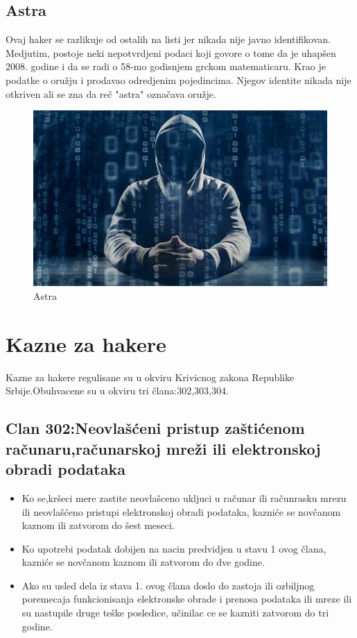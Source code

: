 \documentclass[a4paper]{article}
\begin{document}
\subsection{Astra}
Ovaj haker se razlikuje od ostalih na listi jer nikada nije javno identifikovan. Medjutim, postoje neki nepotvrdjeni podaci koji govore o tome da je uhapšen 2008. godine i da se radi o 58-mo godisnjem grckom matematicaru. Krao je podatke o oružju i prodavao odredjenim pojedincima. Njegov identite nikada nije otkriven ali se zna da reč "astra" označava oružje.
\begin{figure}[h!]
	\begin{center}
		\includegraphics[scale=0.20]{astra.jpg}
	\end{center}
	\caption{Astra}
	\label{fig:astra}
\end{figure}
\newpage
\section{Kazne za hakere}
\label{kazne}
Kazne za hakere regulisane su u okviru Krivicnog zakona Republike Srbije.Obuhvacene su u okviru tri člana:302,303,304.
\subsection{Clan 302:Neovlašćeni pristup zaštićenom računaru,računarskoj mreži ili elektronskoj obradi podataka}
\begin{itemize}
	\item Ko se,kršeci mere zastite neovlašceno ukljuci u računar ili računrasku mrezu ili neovlašćeno pristupi elektronskoj obradi podataka, kazniće se novčanom kaznom ili zatvorom do šest meseci.
	\item Ko upotrebi podatak dobijen na nacin predvidjen u stavu 1 ovog člana, kazniće se novčanom kaznom ili zatvorom do dve godine.
	\item Ako su usled dela iz stava 1. ovog člana doslo do zastoja ili ozbiljnog poremecaja funkcionisanja elektronske obrade i prenosa podataka ili mreze ili su nastupile druge teške posledice, učinilac ce se kazniti zatvorom do tri godine.
\end{itemize}
\end{document}
